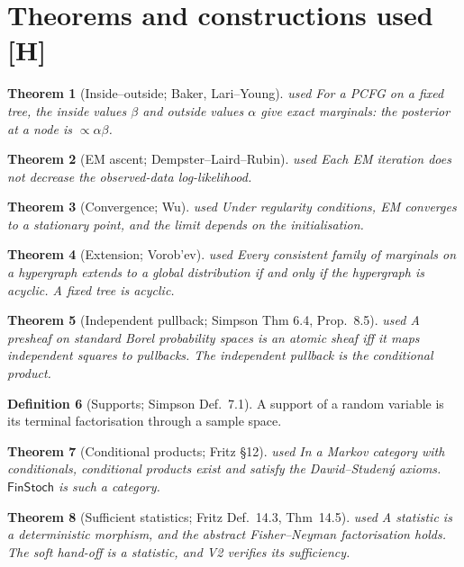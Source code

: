 \documentclass[11pt]{article}
\newtheorem{theorem}{Theorem}[section]
\theoremstyle{definition}
\newtheorem{definition}[theorem]{Definition}
\theoremstyle{remark}
\newcommand{\src}[1]{\textsf{\small[#1]}}
\newcommand{\st}[1]{\textsf{\small\color{gray}#1}}
\begin{document}
\section{Theorems and constructions used \src{H}}\label{sec:theoremsused}
\begin{theorem}[Inside--outside; Baker, Lari--Young]\label{thm:io}\st{used}
For a PCFG on a fixed tree, the inside values $\beta$ and outside values $\alpha$ give exact marginals: the posterior at a node is $\propto\alpha\beta$.
\end{theorem}
\begin{theorem}[EM ascent; Dempster--Laird--Rubin]\label{thm:em}\st{used}
Each EM iteration does not decrease the observed-data log-likelihood.
\end{theorem}
\begin{theorem}[Convergence; Wu]\label{res:auto1}\st{used}
Under regularity conditions, EM converges to a stationary point, and the limit depends on the initialisation.
\end{theorem}
\begin{theorem}[Extension; Vorob'ev]\label{thm:vorobev}\st{used}
Every consistent family of marginals on a hypergraph extends to a global distribution if and only if the hypergraph is acyclic. A fixed tree is acyclic.
\end{theorem}
\begin{theorem}[Independent pullback; Simpson Thm 6.4, Prop.~8.5]\label{res:auto2}\st{used}
A presheaf on standard Borel probability spaces is an atomic sheaf iff it maps independent squares to pullbacks. The independent pullback is the conditional product.
\end{theorem}
\begin{definition}[Supports; Simpson Def.~7.1] A support of a random variable is its terminal factorisation through a sample space.\end{definition}
\begin{theorem}[Conditional products; Fritz \S12]\label{res:auto3}\st{used}
In a Markov category with conditionals, conditional products exist and satisfy the Dawid--Studen\'y axioms. $\mathsf{FinStoch}$ is such a category.
\end{theorem}
\begin{theorem}[Sufficient statistics; Fritz Def.~14.3, Thm~14.5]\label{res:auto4}\st{used}
A statistic is a deterministic morphism, and the abstract Fisher--Neyman factorisation holds. The soft hand-off is a statistic, and V2 verifies its sufficiency.
\end{theorem}
\end{document}
